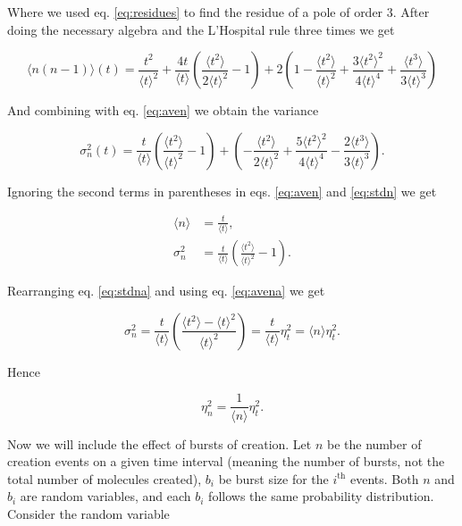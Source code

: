 Where we used eq. \eqref{eq:residues} to find the residue of a pole of order $3$. After doing the necessary algebra and the L'Hospital rule three times we get

\begin{equation*}
  \langle n(n-1)\rangle(t)=\frac{t^2}{\langle t\rangle^2}+\frac{4t}{\langle t\rangle}\left(\frac{\langle t^2\rangle}{2\langle t\rangle^2}-1\right)+2\left(1-\frac{\langle t^2\rangle}{\langle t\rangle^2}+\frac{3\langle t^2\rangle^2}{4\langle t\rangle^4}+\frac{\langle t^3\rangle}{3\langle t\rangle^3}\right)
\end{equation*}

And combining with eq. \eqref{eq:aven} we obtain the variance

\begin{equation}
  \label{eq:stdn}
  \sigma_n^2(t) = \frac{t}{\langle t\rangle}\left(\frac{\langle t^2\rangle}{\langle t\rangle^2}-1\right)+\left(-\frac{\langle t^2\rangle}{2\langle t\rangle^2} + \frac{5\langle t^2\rangle^2}{4\langle t\rangle^4}-\frac{2\langle t^3\rangle}{3\langle t\rangle^3}\right).
\end{equation}


Ignoring the second terms in parentheses in eqs. \ref{eq:aven} and \ref{eq:stdn} we get

\begin{align}
  \langle n\rangle &= \frac{t}{\langle t\rangle}, \label{eq:avena} \\
  \sigma_n^2 &= \frac{t}{\langle t\rangle}\left(\frac{\langle t^2\rangle}{\langle t\rangle^2}-1\right). \label{eq:stdna}
\end{align}

Rearranging eq. \eqref{eq:stdna} and using eq. \eqref{eq:avena} we get

\begin{equation*}
  \sigma_n^2 = \frac{t}{\langle t\rangle}\left(\frac{\langle t^2\rangle - \langle t\rangle^2}{\langle t\rangle^2}\right) = \frac{t}{\langle t\rangle}\eta_t^2 = \langle n\rangle\eta_t^2.
\end{equation*}

Hence

\begin{equation}
  \label{eq:noisen1}
  \eta_n^2=\frac{1}{\langle n\rangle}\eta_t^2.
\end{equation}

Now we will include the effect of bursts of creation. Let $n$ be the number of creation events on a given time interval (meaning the number of bursts, not the total number of molecules created), $b_i$ be burst size for the $i^{\text{th}}$ events. Both $n$ and $b_i$ are random variables, and each $b_i$ follows the same probability distribution. Consider the random variable

